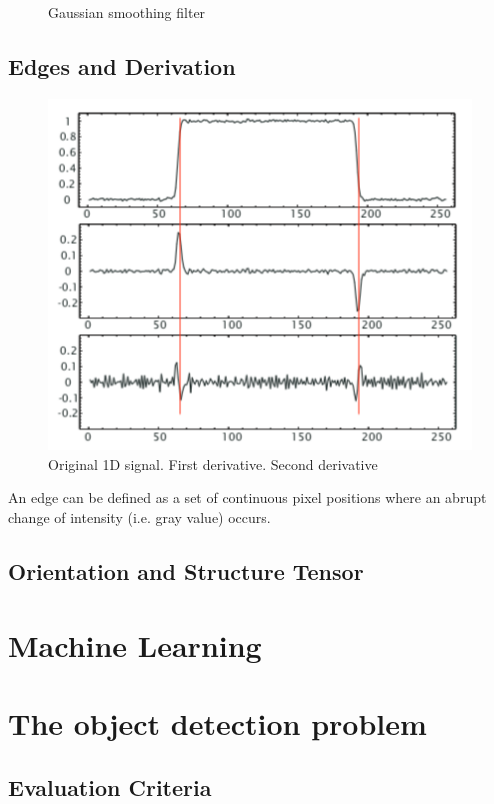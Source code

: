 \begin{figure}
		    \caption{Gaussian smoothing filter}
		    \label{fig:gauss_intro}
		\end{figure}




		\subsection{Edges and Derivation}
		\begin{figure}\label{fig:edges_intro}
			\centering
			\includegraphics[scale=0.8]{graphs/edges_intro.png}
			\caption{Original 1D signal. First derivative. Second derivative}
		\end{figure}
		An edge can be defined as a set of continuous pixel positions where an abrupt change of intensity (i.e. gray value) occurs. 
		
		
		
		\subsection{Orientation and Structure Tensor}
		
	
	\section{Machine Learning}
	\label{machine_learning}
	
	\section{The object detection problem}
	\label{the_object_detection_problem}
		\subsection{Evaluation Criteria}
